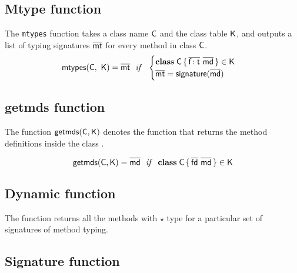 \documentclass[acmlarge, anonymous, authordraft]{acmart}
\begin{document}
\subsection{Mtype function}

The \texttt{mtypes} function takes a class name $\C$ and the class table
$\K$, and outputs a list of typing signatures $\b\mt$ for every method in
class $\C$. \\


\begin{equation*}
\classoff\C\K = \b\mt ~~\mathit{if}~~ \begin{cases}

 \Class \C {\b{\Ftype\f\t}}{\b\md} \in \K\\
 \b\mt = \sign{\b\md} 

\end{cases}
\end{equation*}

\subsection{getmds function}

The function $\getmds\C\K$ denotes the function that returns the method definitions inside the class \C.

\begin{equation*}
\getmds\C\K = \b\md ~~\mathit{if}~~ \Class\C{\b{\fd}}{\b\md} \in \K
\end{equation*}

\subsection{Dynamic function}

The  function returns all the methods with $\star$ type for a particular set of 
signatures of method typing.

\begin{mathpar}

\end{mathpar}

\subsection{Signature function}
\end{document}

